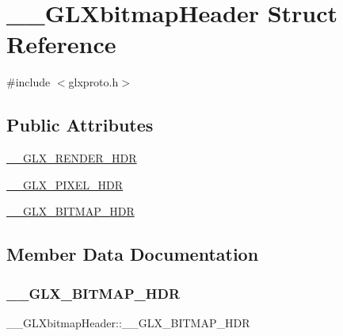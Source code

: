 \hypertarget{struct_____g_l_xbitmap_header}{}\section{\+\_\+\+\_\+\+G\+L\+Xbitmap\+Header Struct Reference}
\label{struct_____g_l_xbitmap_header}


{\ttfamily \#include $<$glxproto.\+h$>$}

\subsection*{Public Attributes}
\begin{DoxyCompactItemize}
\item 
\hyperlink{struct_____g_l_xbitmap_header_a413ff5bc6d77b895062c55ead2d95499}{\+\_\+\+\_\+\+G\+L\+X\+\_\+\+R\+E\+N\+D\+E\+R\+\_\+\+H\+DR}
\item 
\hyperlink{struct_____g_l_xbitmap_header_a372724c772bc3707192737153b06207c}{\+\_\+\+\_\+\+G\+L\+X\+\_\+\+P\+I\+X\+E\+L\+\_\+\+H\+DR}
\item 
\hyperlink{struct_____g_l_xbitmap_header_a32283ef63ae931680a8b6e0220d251cf}{\+\_\+\+\_\+\+G\+L\+X\+\_\+\+B\+I\+T\+M\+A\+P\+\_\+\+H\+DR}
\end{DoxyCompactItemize}


\subsection{Member Data Documentation}
\mbox{\label{struct_____g_l_xbitmap_header_a32283ef63ae931680a8b6e0220d251cf}} 
\subsubsection{\texorpdfstring{\+\_\+\+\_\+\+G\+L\+X\+\_\+\+B\+I\+T\+M\+A\+P\+\_\+\+H\+DR}{\_\_GLX\_BITMAP\_HDR}}
{\footnotesize\ttfamily \+\_\+\+\_\+\+G\+L\+Xbitmap\+Header\+::\+\_\+\+\_\+\+G\+L\+X\+\_\+\+B\+I\+T\+M\+A\+P\+\_\+\+H\+DR}

